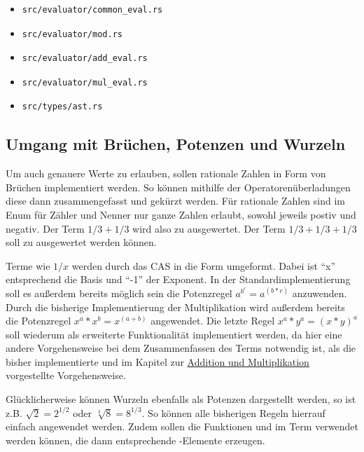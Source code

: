 \documentclass[11pt,a4paper, ngerman]{article}
\begin{document}
\begin{itemize}
    \item \begin{verbatim}src/evaluator/common_eval.rs\end{verbatim}
    \item \begin{verbatim}src/evaluator/mod.rs\end{verbatim}
    \item \begin{verbatim}src/evaluator/add_eval.rs\end{verbatim}
    \item \begin{verbatim}src/evaluator/mul_eval.rs\end{verbatim}
    \item \begin{verbatim}src/types/ast.rs\end{verbatim}
\end{itemize}

\subsection{Umgang mit Brüchen, Potenzen und Wurzeln}
Um auch genauere Werte zu erlauben, sollen rationale Zahlen in Form von Brüchen implementiert werden. So können mithilfe der Operatorenüberladungen diese dann zusammengefasst und gekürzt werden. Für rationale Zahlen sind im Enum  für Zähler und Nenner nur ganze Zahlen erlaubt, sowohl jeweils postiv und negativ. Der Term $1/3+1/3$ wird also zu  ausgewertet. Der Term $1/3+1/3+1/3$ soll zu  ausgewertet werden können.

Terme wie $1/x$ werden durch das CAS in die Form  umgeformt. Dabei ist ``x'' entsprechend die Basis und ``-1'' der Exponent. In der Standardimplementierung soll es außerdem bereits möglich sein die Potenzregel $a^{b^{c}} = a^{(b*c)}$ anzuwenden. Durch die bisherige Implementierung der Multiplikation wird außerdem bereits die Potenzregel $x^a*x^b = x^{(a+b)}$ angewendet. Die letzte Regel $x^a*y^a = (x*y)^a$ soll wiederum als erweiterte Funktionalität implementiert werden, da hier eine andere Vorgehensweise bei dem Zusammenfassen des Terms notwendig ist, als die bisher implementierte und im Kapitel zur \hyperref[sec:kapAddnundMult]{Addition und Multiplikation} vorgestellte Vorgehensweise.

Glücklicherweise können Wurzeln ebenfalls als Potenzen dargestellt werden, so ist z.B. $\sqrt{2} = 2^{1/2}$ oder $\sqrt[3]{8} = 8^{1/3}$. So können alle bisherigen Regeln hierrauf einfach angewendet werden. Zudem sollen die Funktionen  und  im Term verwendet werden können, die dann entsprechende -Elemente erzeugen.
\end{document}
